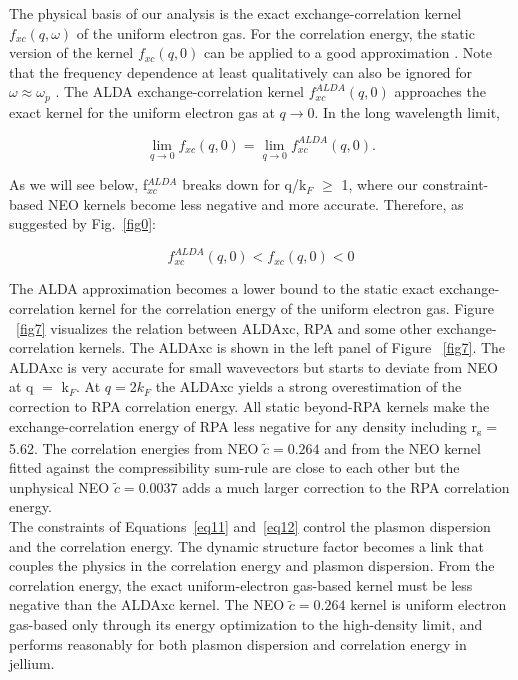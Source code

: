 \documentclass[aps,amsmath,amssymb, preprint, 12pt]{revtex4-1}
\begin{document}
The physical basis of our analysis is the exact exchange-correlation kernel   \( f_{xc} \left( q, \omega  \right)  \)  of the uniform electron gas. For the correlation energy, the static version of the kernel  \( f_{xc} \left( q,0 \right)  \)  can be applied to a good approximation \cite{LGP00}. Note that the frequency dependence at least qualitatively can also be ignored for \(  \omega  \approx  \omega _{p} \)  \cite{IG87, GK85}. The ALDA exchange-correlation kernel  \( f^{ALDA}_{xc} \left( q,0 \right)  \) approaches the exact kernel for the uniform electron gas at  \( q \rightarrow 0 \). In the long wavelength limit,

\begin{equation}
\lim\limits_{q \rightarrow 0} f_{xc} ( q,0) = \lim\limits_{q \rightarrow 0}f_{xc}^{ALDA} ( q,0 ).
 \label{eq11}
\end{equation}

\noindent As we will see below, f$^{ALDA}_{xc}$ breaks down for q/k$_F$ $\geq$ 1, where our constraint-based NEO kernels become less negative and more accurate. Therefore, as suggested by Fig.~\ref{fig0}:



\begin{equation}
f_{xc}^{ALDA} ( q,0 ) <f_{xc} ( q,0 ) < 0
\label{eq12}
\end{equation}



\noindent The ALDA approximation becomes a lower bound to the static exact exchange-correlation kernel for the correlation energy of the uniform electron gas. Figure ~\ref{fig7} visualizes the relation between ALDAxc, RPA and some other exchange-correlation kernels.  The ALDAxc is shown in the left panel of Figure ~\ref{fig7}. The ALDAxc is very accurate for small wavevectors but starts to deviate from NEO at q $=$ k$_F$. At \(  q=2k_{F} \)  the ALDAxc yields a strong overestimation of the correction to RPA correlation energy. All static beyond-RPA kernels make the exchange-correlation energy of RPA less negative for any density including r\textsubscript{s} = 5.62. The correlation energies from NEO  \( \widetilde{c}=0.264 \)  and from the NEO kernel fitted against the compressibility sum-rule  are close to each other but the unphysical NEO  \( \widetilde{c}=0.0037 \)  adds a much larger correction to the RPA correlation energy.\\

The constraints of Equations~\ref{eq11} and~\ref{eq12} control the plasmon dispersion and the correlation energy. The dynamic structure factor becomes a link that couples the physics in the correlation energy and plasmon dispersion. From the correlation energy, the exact uniform-electron gas-based kernel must be less negative than the ALDAxc kernel. The NEO  \( \widetilde{c}=0.264 \)  kernel is uniform electron gas-based only through its energy optimization to the high-density limit, and performs reasonably for both plasmon dispersion and correlation energy in jellium.
\end{document}
